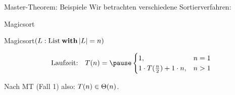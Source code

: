 \begin{frame}[t]{Master-Theorem: Beispiele}
	Wir betrachten verschiedene Sortierverfahren:\\
	\bigskip
		
	\begin{exampleblock}{Magicsort}
		\begin{algorithm}[H]
			\KwMethod Magicsort$(L: \|List| \: \KwSty{with} \size{L} = n)$
		\end{algorithm}
	\end{exampleblock}
	
	\[\text{Laufzeit:} \quad T(n) = \pause \begin{cases}
	1, & n = 1\\
	1 \cdot T(\fract n/2 ) + 1 \cdot n, & n > 1
	\end{cases}\]
	
	\pause
	Nach MT (Fall 1) also: $T(n) \in \Theta\!\left(n\right)$.
\end{frame}

\newcommand{\mastertheoreminder}{
	\scalebox{.8}{
		\begin{varwidth}{\columnwidth}
			Erinnerung Master-Theorem: \\
			$
			T(n) = \casesl{
				a,  & n = 1 \\
				\textcolor{darkgreen}{d} \cdot T\large(\frac{n}{\textcolor{blue}{b}}\large) + c\·n, & n > 1
			} 
			$ \hspace{-1.2\baselineskip} \\
			\impl 	$T(n) \in 
			\begin{cases}
			\Th{n},                                                        & \textcolor{darkgreen}{d} < \textcolor{blue}{b} \\
			\Th{n \log n},                                                 & \textcolor{darkgreen}{d} = \textcolor{blue}{b} \\
			\Th{n^{\log _{\textcolor{blue}{b}} \textcolor{darkgreen}{d}}}, & \textcolor{darkgreen}{d} > \textcolor{blue}{b}
			\end{cases}$. 	
		\end{varwidth}
	}
}

